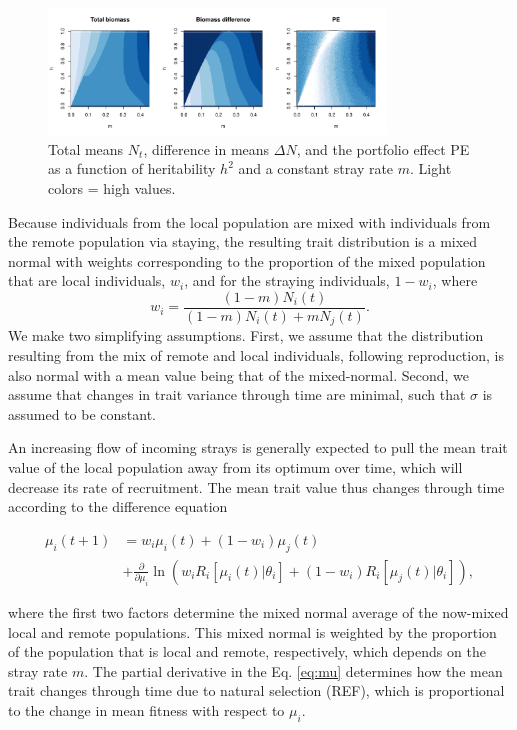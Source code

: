 \documentclass[twocolumn,preprintnumbers,amsmath,amssymb,superscriptaddress]{revtex4}
\begin{document}
\begin{figure}
  \captionsetup{justification=raggedright,
singlelinecheck=false
}
\centering
\includegraphics[width=0.8\textwidth]{figs2/fig_MDPE_hm.pdf}
\caption{
Total means $N_t$, difference in means $\Delta N$, and the portfolio effect PE as a function of heritability $h^2$ and a constant stray rate $m$. Light colors = high values.
} \label{fig:PE}
\end{figure}

Because individuals from the local population are mixed with individuals from the remote population via staying, the resulting trait distribution is a mixed normal with weights corresponding to the proportion of the mixed population that are local individuals, $w_i$, and for the straying individuals, $1-w_i$, where 
\begin{equation}
w_i=\frac{(1-m)N_i(t)}{(1-m) N_i(t) + m N_j(t)}.
\end{equation}
We make two simplifying assumptions.
First, we assume that the distribution resulting from the mix of remote and local individuals, following reproduction, is also normal with a mean value being that of the mixed-normal.
Second, we assume that changes in trait variance through time are minimal, such that $\sigma$ is assumed to be constant.



An increasing flow of incoming strays is generally expected to pull the mean trait value of the local population away from its optimum over time, which will decrease its rate of recruitment.
The mean trait value thus changes through time according to the difference equation

\begin{align}
  \mu_i(t+1) &= w_i\mu_i(t) + (1-w_i)\mu_j(t) \\ \nonumber
  &+ \frac{\partial}{\partial \mu_i}\ln\left(w_i R_i[\mu_i(t)|\theta_i] + (1-w_i)R_i[\mu_j(t)|\theta_i]  \right),
  \label{eq:mu}
\end{align}

\noindent where the first two factors determine the mixed normal average of the now-mixed local and remote populations.
This mixed normal is weighted by the proportion of the population that is local and remote, respectively, which depends on the stray rate $m$.
The partial derivative in the Eq. \ref{eq:mu} determines how the mean trait changes through time due to natural selection (REF), which is proportional to the change in mean fitness with respect to $\mu_i$.
\end{document}
